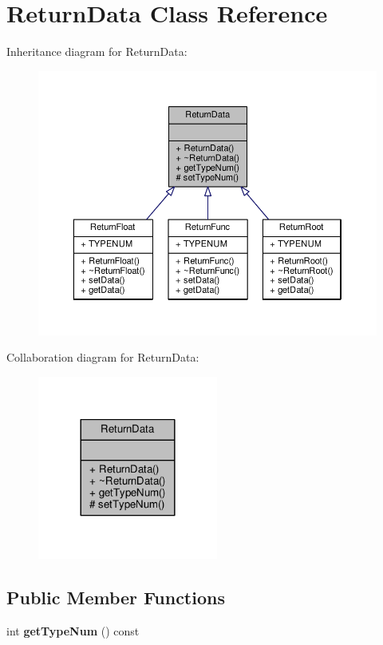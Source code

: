 \hypertarget{classReturnData}{}\section{Return\+Data Class Reference}
\label{classReturnData}


Inheritance diagram for Return\+Data\+:
\nopagebreak
\begin{figure}[H]
\begin{center}
\leavevmode
\includegraphics[width=350pt]{classReturnData__inherit__graph}
\end{center}
\end{figure}


Collaboration diagram for Return\+Data\+:
\nopagebreak
\begin{figure}[H]
\begin{center}
\leavevmode
\includegraphics[width=168pt]{classReturnData__coll__graph}
\end{center}
\end{figure}
\subsection*{Public Member Functions}
\begin{DoxyCompactItemize}
\item 
\hypertarget{classReturnData_a2084b45b7c5c4f93a7dbf0cafcc295ae}{}\label{classReturnData_a2084b45b7c5c4f93a7dbf0cafcc295ae} 
int {\bfseries get\+Type\+Num} () const
\end{DoxyCompactItemize}
